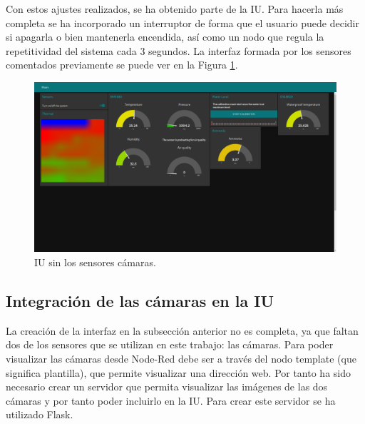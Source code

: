 Con estos ajustes realizados, se ha obtenido parte de la IU. Para hacerla más completa se ha incorporado un interruptor de forma que el usuario puede decidir si apagarla o bien mantenerla encendida, así como un nodo que regula la repetitividad del sistema cada 3 segundos. La interfaz formada por los sensores comentados previamente se puede ver en la Figura \ref{fig:ui_nocams}.
\begin{figure} [h!]
  \begin{center}
    \includegraphics[width=16cm]{figs/ui_nocams}
  \end{center}
  \caption{IU sin los sensores cámaras.}
  \label{fig:ui_nocams}
\end{figure}

\subsection{Integración de las cámaras en la IU}
La creación de la interfaz en la subsección anterior no es completa, ya que faltan dos de los sensores que se utilizan en este trabajo: las cámaras. Para poder visualizar las cámaras desde Node-Red debe ser a través del nodo template (que significa plantilla), que permite visualizar una dirección web. Por tanto ha sido necesario crear un servidor que permita visualizar las imágenes de las dos cámaras y por tanto poder incluirlo en la IU. Para crear este servidor se ha utilizado Flask.\\

